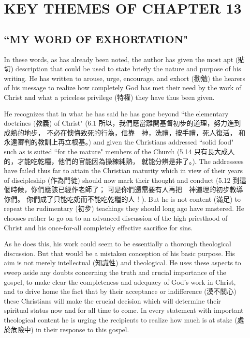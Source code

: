 \chapter{KEY THEMES OF CHAPTER 13}

\section{``MY WORD OF EXHORTATION"}
\Large
In these words, as has already been noted, the author has given the most apt
(貼切) description that could be used to state briefly the nature and purpose
of his writing.
He has written to arouse, urge, encourage, and exhort (勸勉) the hearers of his
message to realize how completely God has met their need by the work of Christ
and what a priceless privilege (特權) they have thus been given.
\newline

He recognizes that in what he has said he has gone beyond ``the elementary
doctrines (教義) of Christ"
{\large (6.1 所以，我們應當離開基督初步的道理，努力進到成熟的地步，
不必在懊悔致死的行為，信靠　神，洗禮，按手禮，死人復活，
和永遠審判的教訓上再立根基。)}
and given the Christians addressed ``solid food" such as is suited ``for the
mature" members of the Church
{\large (5.14 只有長大成人的，才能吃乾糧，他們的官能因為操練純熟，
就能分辨是非了。)}.
The addressees have failed thus far to attain the Christian maturity which in
view of their years of discipleship (作為門徒) should now mark their thought
and conduct
{\large (5.12 到這個時候，你們應該已經作老師了；
可是你們還需要有人再把　神道理的初步教導你們。
你們成了只能吃奶而不能吃乾糧的人！)}.
But he is not content (滿足) to repeat the rudimentary (初步) teachings they
should long ago have mastered.
He chooses rather to go on to an advanced discussion of the high priesthood of
Christ and his once-for-all completely effective sacrifice for sins.
\newline

As he does this, his work could seem to be essentially a thorough theological
discussion.
But that would be a mistaken conception of his basic purpose.
His aim is not merely intellectual (知識性) and theological.
He uses these aspects to sweep aside any doubts concerning the truth and
crucial importance of the gospel, to make clear the completeness and adequacy
of God's work in Christ, and to drive home the fact that by their acceptance or
indifference (漠不關心) these Christians will make the crucial decision which
will determine their spiritual status now and for all time to come.
In every statement with important theological content he is urging the
recipients to realize how much is at stake (處於危險中) in their response to
this gospel.
\newline

